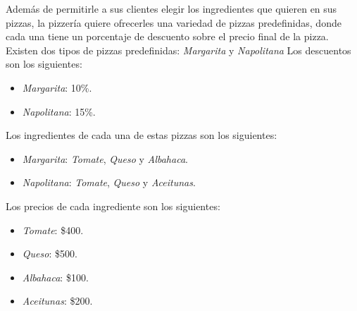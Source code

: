 \begin{Exercise}[title={La Pizzería}]
    \ExeText Además de permitirle a sus clientes elegir los ingredientes que quieren en sus pizzas,
      la pizzería quiere ofrecerles una variedad de pizzas predefinidas, donde cada una tiene un
      porcentaje de descuento sobre el precio final de la pizza.
      Existen dos tipos de pizzas predefinidas: \textit{Margarita} y \textit{Napolitana}
      Los descuentos son los siguientes:

      \begin{itemize}
        \item \textit{Margarita}: 10\%.
        \item \textit{Napolitana}: 15\%.
      \end{itemize}

      Los ingredientes de cada una de estas pizzas son los siguientes:

      \begin{itemize}
        \item \textit{Margarita}: \textit{Tomate}, \textit{Queso} y \textit{Albahaca}.
        \item \textit{Napolitana}: \textit{Tomate}, \textit{Queso} y \textit{Aceitunas}.
      \end{itemize}

      Los precios de cada ingrediente son los siguientes:

      \begin{itemize}
        \item \textit{Tomate}: \$400.
        \item \textit{Queso}: \$500.
        \item \textit{Albahaca}: \$100.
        \item \textit{Aceitunas}: \$200.
      \end{itemize}
    

\end{Exercise}
